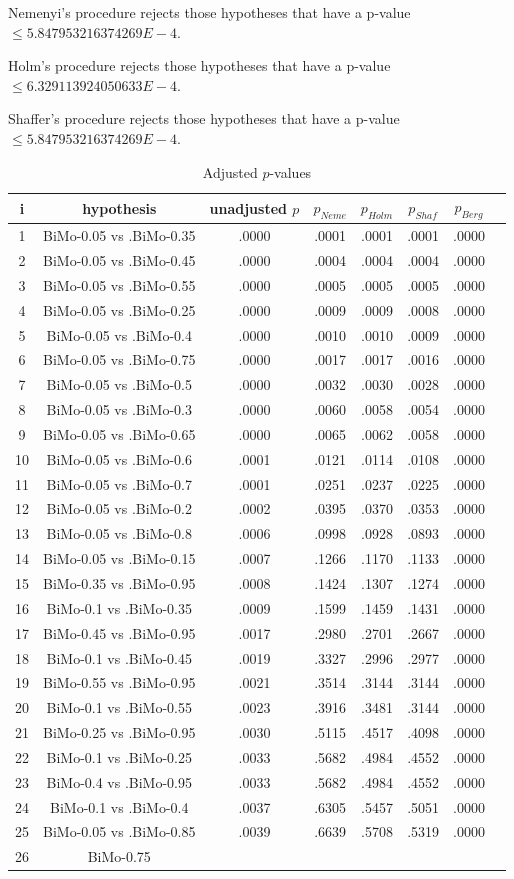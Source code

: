 \documentclass[a4paper,10pt]{article}
\begin{document}
\begin{landscape}
\begin{table}[!htp]
\begin{tabular}{cccccc}
\end{tabular}
\end{table}
Nemenyi's procedure rejects those hypotheses that have a p-value $\le5.847953216374269E-4$.


Holm's procedure rejects those hypotheses that have a p-value $\le6.329113924050633E-4$.


Shaffer's procedure rejects those hypotheses that have a p-value $\le5.847953216374269E-4$.


\begin{table}[!htp]
\centering\tiny
\caption{Adjusted $p$-values}
\begin{tabular}{cccccccc}
i&hypothesis&unadjusted $p$&$p_{Neme}$&$p_{Holm}$&$p_{Shaf}$&$p_{Berg}$\\
\hline
1&BiMo-0.05 vs .BiMo-0.35&.0000&.0001&.0001&.0001&.0000\\2&BiMo-0.05 vs .BiMo-0.45&.0000&.0004&.0004&.0004&.0000\\3&BiMo-0.05 vs .BiMo-0.55&.0000&.0005&.0005&.0005&.0000\\4&BiMo-0.05 vs .BiMo-0.25&.0000&.0009&.0009&.0008&.0000\\5&BiMo-0.05 vs .BiMo-0.4&.0000&.0010&.0010&.0009&.0000\\6&BiMo-0.05 vs .BiMo-0.75&.0000&.0017&.0017&.0016&.0000\\7&BiMo-0.05 vs .BiMo-0.5&.0000&.0032&.0030&.0028&.0000\\8&BiMo-0.05 vs .BiMo-0.3&.0000&.0060&.0058&.0054&.0000\\9&BiMo-0.05 vs .BiMo-0.65&.0000&.0065&.0062&.0058&.0000\\10&BiMo-0.05 vs .BiMo-0.6&.0001&.0121&.0114&.0108&.0000\\11&BiMo-0.05 vs .BiMo-0.7&.0001&.0251&.0237&.0225&.0000\\12&BiMo-0.05 vs .BiMo-0.2&.0002&.0395&.0370&.0353&.0000\\13&BiMo-0.05 vs .BiMo-0.8&.0006&.0998&.0928&.0893&.0000\\14&BiMo-0.05 vs .BiMo-0.15&.0007&.1266&.1170&.1133&.0000\\15&BiMo-0.35 vs .BiMo-0.95&.0008&.1424&.1307&.1274&.0000\\16&BiMo-0.1 vs .BiMo-0.35&.0009&.1599&.1459&.1431&.0000\\17&BiMo-0.45 vs .BiMo-0.95&.0017&.2980&.2701&.2667&.0000\\18&BiMo-0.1 vs .BiMo-0.45&.0019&.3327&.2996&.2977&.0000\\19&BiMo-0.55 vs .BiMo-0.95&.0021&.3514&.3144&.3144&.0000\\20&BiMo-0.1 vs .BiMo-0.55&.0023&.3916&.3481&.3144&.0000\\21&BiMo-0.25 vs .BiMo-0.95&.0030&.5115&.4517&.4098&.0000\\22&BiMo-0.1 vs .BiMo-0.25&.0033&.5682&.4984&.4552&.0000\\23&BiMo-0.4 vs .BiMo-0.95&.0033&.5682&.4984&.4552&.0000\\24&BiMo-0.1 vs .BiMo-0.4&.0037&.6305&.5457&.5051&.0000\\25&BiMo-0.05 vs .BiMo-0.85&.0039&.6639&.5708&.5319&.0000\\26&BiMo-0.75 
\end{tabular}
\end{table}
\end{landscape}
\end{document}
